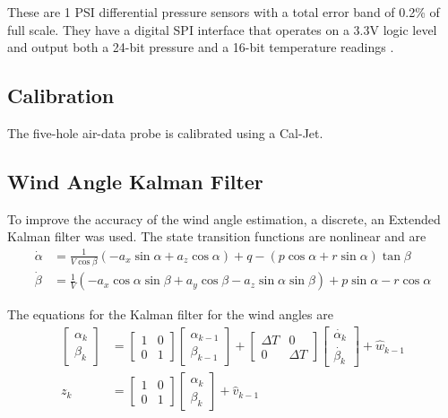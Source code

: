 \documentclass[12pt]{ucthesis}
\begin{document}
These are 1 PSI differential pressure sensors with a total error band of 0.2\% of full scale. They have a digital SPI interface that operates on a 3.3V logic level and output both a 24-bit pressure and a 16-bit temperature readings \cite{HoneywellIPTDataSheet}.
\subsection{Calibration}
The five-hole air-data probe is calibrated using a Cal-Jet.
\subsection{Wind Angle Kalman Filter}

To improve the accuracy of the wind angle estimation, a discrete, an Extended Kalman filter was used. The state transition functions are nonlinear and are
\begin{align}
\dot{\alpha} & = \frac{1}{V\cos\beta}(-a_x\sin\alpha+a_z\cos\alpha)+q-(p\cos\alpha+r\sin\alpha)\tan\beta\\
\dot{\beta} &=\frac{1}{V}(-a_x\cos\alpha\sin\beta+a_y\cos\beta-a_z\sin\alpha\sin\beta)+p\sin\alpha-r\cos\alpha
\end{align}

The equations for the Kalman filter for the wind angles are
\begin{align}
\begin{bmatrix}
\alpha_k\\\beta_k
\end{bmatrix} &= \begin{bmatrix}
1& 0\\0&1
\end{bmatrix}\begin{bmatrix}
\alpha_{k-1}\\\beta_{k-1}
\end{bmatrix}+\begin{bmatrix}
\Delta T& 0\\0&\Delta T
\end{bmatrix}\begin{bmatrix}
\dot{\alpha_{k}}\\\dot{\beta_{k}}
\end{bmatrix}+\hat{w}_{k-1}\\
z_k & = \begin{bmatrix}
1 & 0\\0&1
\end{bmatrix}\begin{bmatrix}
\alpha_{k}\\
\beta_{k}
\end{bmatrix}+\hat{v}_{k-1}
\end{align}
\end{document}

